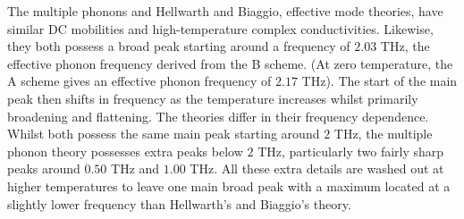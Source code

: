 The multiple phonons and Hellwarth and Biaggio, effective mode theories, have similar DC mobilities and high-temperature complex conductivities. Likewise, they both possess a broad peak starting around a frequency of $2.03$ THz, the effective phonon frequency derived from the B scheme. (At zero temperature, the A scheme gives an effective phonon frequency of $2.17$ THz). The start of the main peak then shifts in frequency as the temperature increases whilst primarily broadening and flattening. The theories differ in their frequency dependence. Whilst both possess the same main peak starting around $2$ THz, the multiple phonon theory possesses extra peaks below $2$ THz, particularly two fairly sharp peaks around $0.50$ THz and $1.00$ THz. All these extra details are washed out at higher temperatures to leave one main broad peak with a maximum located at a slightly lower frequency than Hellwarth's and Biaggio's theory.


